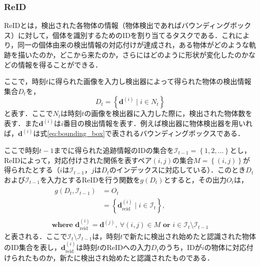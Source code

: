         \subsubsection{ReID}
        ReIDとは，検出された各物体の情報（物体検出であればバウンディングボックス）に対して，個体を識別するためのIDを割り当てるタスクである．これにより，同一の個体由来の検出情報の対応付けが達成され，ある物体がどのような軌跡を描いたのか，どこから来たのか，さらにはどのように形状が変化したのかなどの情報を得ることができる．

        ここで，時刻$t$に得られた画像を入力し検出器によって得られた物体の検出情報集合$D_t$を，
        \begin{equation}
            \label{eq:input_to_reid}
            D_t = \left\{\bm{d}^{(i)} \mid i \in N_t\right\}
        \end{equation}
        と表す．ここで$N_t$は時刻$t$の画像を検出器に入力した際に，検出された物体数を表す．また$\bm{d}^{(i)}$は$i$番目の検出情報を表す．例えば検出器に物体検出器を用いれば，$\bm{d}^{(i)}$は式\ref{eq:bounding_box}で表されるバウンディングボックスである．

        ここで時刻$t-1$までに得られた追跡情報のIDの集合を$\mathcal{I}_{t-1} = \left\{1, 2, \dots\right\}$とし，ReIDによって，対応付けされた関係を表すペア$(i, j)$の集合$M = \left\{(i, j)\right\}$が得られたとする（$i$は$\mathcal{I}_{t-1}$，$j$は$D_t$のインデックスに対応している）．このとき$D_t$および$\mathcal{I}_{t-1}$を入力とするReIDを行う関数を$g(D_t)$とすると，その出力$O_t$は，
        \begin{equation}
            \label{eq:output_of_reid}
            \begin{gathered}
                \begin{aligned}
                    g(D_t, \mathcal{I}_{t-1}) &= O_t
                    \\ &= \left\{\bm{d}_{\text{reid}}^{(i)} \mid i \in \mathcal{I}_t\right\},
                \end{aligned}
                \\ \textbf{where } \bm{d}_{\text{reid}}^{(i)} = \bm{d}^{(j)}, ~ \forall (i, j) \in M \textbf{ or } i \in \mathcal{I}_t \setminus \mathcal{I}_{t-1}
            \end{gathered}
        \end{equation}
        と表される．ここで$\mathcal{I}_t \setminus \mathcal{I}_{t-1}$は，時刻$t$で新たに検出され始めたと認識された物体のID集合を表し，$\bm{d}_{\text{reid}}^{(i)}$は時刻$t$のReIDへの入力$D_t$のうち，IDが$i$の物体に対応付けられたものか，新たに検出され始めたと認識されたものである．

